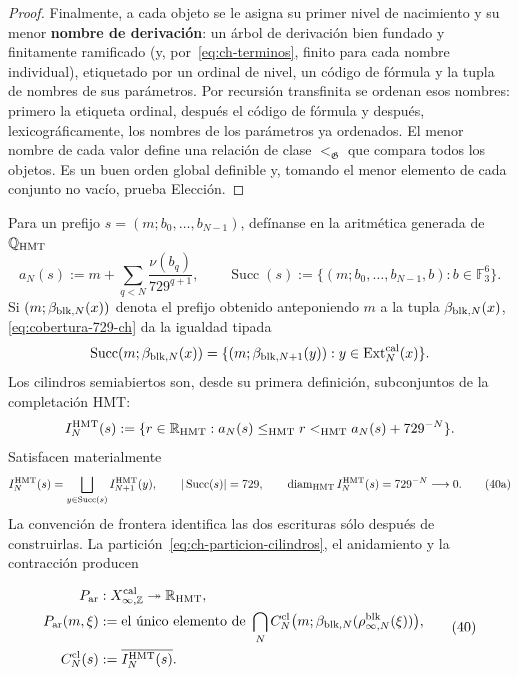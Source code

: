 \begin{proof}
Finalmente, a cada objeto se le asigna su primer nivel de nacimiento y su
menor \textbf{nombre de derivación}: un árbol de derivación bien fundado y
finitamente ramificado (y, por~\eqref{eq:ch-terminos}, finito para cada nombre individual), etiquetado por un
ordinal de nivel, un código de fórmula y la tupla de nombres de sus parámetros.
Por recursión transfinita se ordenan esos nombres: primero la etiqueta ordinal,
después el código de fórmula y después, lexicográficamente, los nombres de los
parámetros ya ordenados. El menor nombre de cada valor define una relación de
clase \(<_{\mathfrak G}\) que compara todos los objetos. Es un buen orden
global definible y, tomando el menor elemento de cada conjunto no vacío,
prueba Elección.
\end{proof}





Para un prefijo \(s=(m;b_0,\ldots,b_{N-1})\), defínanse en la aritmética
generada de \(\mathbb Q_{\rm HMT}\)
\[
 a_N(s):=m+\sum_{q<N}\frac{\nu(b_q)}{729^{q+1}},
 \qquad
 \operatorname{Succ}(s):=
 \{(m;b_0,\ldots,b_{N-1},b):b\in\mathbb F_3^6\}.
\]
Si \((m;\beta_{{\rm blk},N}(x))\) denota el prefijo obtenido anteponiendo
\(m\) a la tupla \(\beta_{{\rm blk},N}(x)\),
\eqref{eq:cobertura-729-ch} da la igualdad tipada
\[
 \operatorname{Succ}(m;\beta_{{\rm blk},N}(x))
 =\{(m;\beta_{{\rm blk},N+1}(y)):
       y\in\operatorname{Ext}^{\rm cal}_N(x)\}.
\]
Los cilindros semiabiertos son, desde su primera definición, subconjuntos de
la completación HMT:
\[
 I_N^{\rm HMT}(s):=
 \{r\in\mathbb R_{\rm HMT}:
      a_N(s)\le_{\rm HMT}r<_{\rm HMT}a_N(s)+729^{-N}\}.
\]
Satisfacen materialmente
\[
 I_N^{\rm HMT}(s)=
 \bigsqcup_{y\in\operatorname{Succ}(s)}I_{N+1}^{\rm HMT}(y),
 \qquad |\operatorname{Succ}(s)|=729,
 \qquad \operatorname{diam}_{\rm HMT}I_N^{\rm HMT}(s)
      =729^{-N}\longrightarrow0.
\tag{40a}\label{eq:ch-particion-cilindros}
\]
La convención de frontera identifica las dos escrituras sólo después de
construirlas. La partición~\eqref{eq:ch-particion-cilindros}, el anidamiento y la contracción producen

\[
\begin{aligned}
 P_{\rm ar}&:X_{\infty,\mathbb Z}^{\rm cal}
     \twoheadrightarrow\mathbb R_{\rm HMT},\\
 P_{\rm ar}(m,\xi)
   &:=\text{el único elemento de }
     \bigcap_N C_N^{\rm cl}
       \bigl(m;\beta_{{\rm blk},N}(\rho^{\rm blk}_{\infty,N}(\xi))\bigr),\\
 C_N^{\rm cl}(s)&:=\overline{I_N^{\rm HMT}(s)}.
\end{aligned}
\tag{40}\label{eq:ch-proyeccion-arquimediana}
\]

